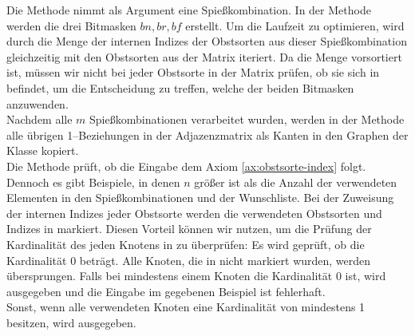 Die Methode  nimmt als Argument eine Spießkombination. 
In der Methode werden die drei Bitmasken $bn, br, bf$ erstellt.
Um die Laufzeit zu optimieren, wird durch die Menge der internen Indizes der Obstsorten 
aus dieser Spießkombination gleichzeitig mit den Obstsorten aus der Matrix iteriert.
Da die Menge  vorsortiert ist, müssen wir nicht bei jeder Obstsorte in der Matrix
prüfen, ob sie sich in  befindet, um die Entscheidung zu treffen, welche der beiden
Bitmasken anzuwenden.\\
Nachdem alle $m$ Spießkombinationen verarbeitet wurden, werden in der Methode 
alle übrigen 1--Beziehungen in der Adjazenzmatrix
als Kanten in den Graphen  der Klasse  kopiert.\\

Die Methode  prüft, ob die Eingabe dem Axiom \ref{ax:obstsorte-index} folgt.
Dennoch es gibt Beispiele, in denen $n$ größer ist als die Anzahl der verwendeten Elementen in den
Spießkombinationen und der Wunschliste.
Bei der Zuweisung der internen Indizes jeder Obstsorte werden die verwendeten Obstsorten und Indizes
in  markiert. Diesen Vorteil können wir nutzen, um die Prüfung der Kardinalität des
jeden Knotens in  zu überprüfen: Es wird geprüft, ob die Kardinalität 0 beträgt. 
Alle Knoten, die in  nicht markiert wurden, werden übersprungen.
Falls bei mindestens einem Knoten die Kardinalität 0 ist, wird  ausgegeben und
die Eingabe im gegebenen Beispiel ist fehlerhaft.\\
Sonst, wenn alle verwendeten Knoten eine Kardinalität von mindestens 1 besitzen, wird 
ausgegeben.\\ 

